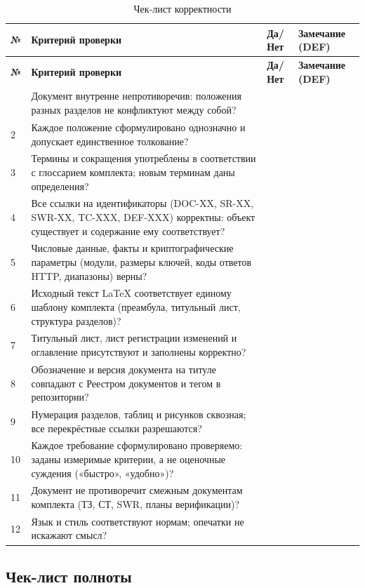 \documentclass[12pt,a4paper]{article}
\begin{document}
\begin{longtable}{|p{0.8cm}|p{6.3cm}|p{1.8cm}|p{5.2cm}|}
\caption{Чек-лист корректности}\\
\hline
\textbf{№} & \textbf{Критерий проверки} & \textbf{Да/Нет} & \textbf{Замечание (DEF)} \\
\hline
\endfirsthead
\hline
\textbf{№} & \textbf{Критерий проверки} & \textbf{Да/Нет} & \textbf{Замечание (DEF)} \\
\hline
\endhead
\hline
\endfoot
\hline
\endlastfoot
1 & Документ внутренне непротиворечив: положения разных разделов не конфликтуют между собой? & & \\
\hline
2 & Каждое положение сформулировано однозначно и допускает единственное толкование? & & \\
\hline
3 & Термины и сокращения употреблены в соответствии с глоссарием комплекта; новым терминам даны определения? & & \\
\hline
4 & Все ссылки на идентификаторы (DOC-XX, SR-XX, SWR-XX, TC-XXX, DEF-XXX) корректны: объект существует и содержание ему соответствует? & & \\
\hline
5 & Числовые данные, факты и криптографические параметры (модули, размеры ключей, коды ответов HTTP, диапазоны) верны? & & \\
\hline
6 & Исходный текст LaTeX соответствует единому шаблону комплекта (преамбула, титульный лист, структура разделов)? & & \\
\hline
7 & Титульный лист, лист регистрации изменений и оглавление присутствуют и заполнены корректно? & & \\
\hline
8 & Обозначение и версия документа на титуле совпадают с Реестром документов и тегом в репозитории? & & \\
\hline
9 & Нумерация разделов, таблиц и рисунков сквозная; все перекрёстные ссылки разрешаются? & & \\
\hline
10 & Каждое требование сформулировано проверяемо: заданы измеримые критерии, а не оценочные суждения («быстро», «удобно»)? & & \\
\hline
11 & Документ не противоречит смежным документам комплекта (ТЗ, СТ, SWR, планы верификации)? & & \\
\hline
12 & Язык и стиль соответствуют нормам; опечатки не искажают смысл? & & \\
\hline
\end{longtable}

\subsection{Чек-лист полноты}
\end{document}
